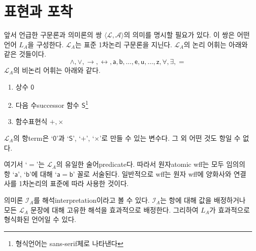 \documentclass[a4paper,chapter,atbegshi]{oblivoir}
\begin{document}
\section{표현과 포착}
앞서 언급한 구문론과 의미론의 쌍 $\langle \mathcal{L},\mathcal{A}\rangle$의 
의미를 명시할 필요가 있다. 이 쌍은 어떤 언어 $L_A$을 구성한다. $\mathcal{L}_A$는
표준 1차논리 구문론을 지닌다. $\mathcal{L}_A$의 논리 어휘는 아래와 같은
것들이다.
\[
  \mathsf{
  \wedge, \vee, \rightarrow, \leftrightarrow, a, b, \ldots, e, u, \ldots, z,
  \forall, \exists, =
}
\]
$\mathcal{L}_A$의 비논리 어휘는 아래와 같다.
\begin{enumerate}
  \item 상수 $\mathsf{0}$
  \item 다음 수{\tiny successor} 함수 $\mathsf{S}$\footnote{형식언어는 \textsf{sans-serif}체로 나타낸다}
  \item 함수표현식 $+, \times$
\end{enumerate}
$\mathcal{L}_A$의 항{\tiny term}은 `$\mathsf{0}$'과 `$\mathsf{S}$',
`$+$', `$\times$'로 만들 수 있는 변수다. 그 외 어떤 것도 항일 수 없다. 

여기서 `$=$'는 $\mathcal{L}_A$의 유일한 술어{\tiny predicate}다. 따라서
원자{\tiny atomic} wff는 모두 임의의 항 `$\mathsf{a}$', `$\mathsf{b}$'에
대해 `$\mathsf{a = b}$' 꼴로 서술된다. 일반적으로 wff는 원자 wff에 양화사와 
연결사를 1차논리의 표준에 따라 사용한 것이다. 

의미론 $\mathcal{I}_A$를 해석{\tiny interpretation}이라고 볼 수 있다.
$\mathcal{I}_A$는 항에 대해 값을 배정하거나 모든 $\mathcal{L}_A$ 문장에 대해
고유한 해석을 효과적으로 배정한다. 그리하여 $L_A$가 효과적으로 형식화된 언어일
수 있다.
\end{document}
